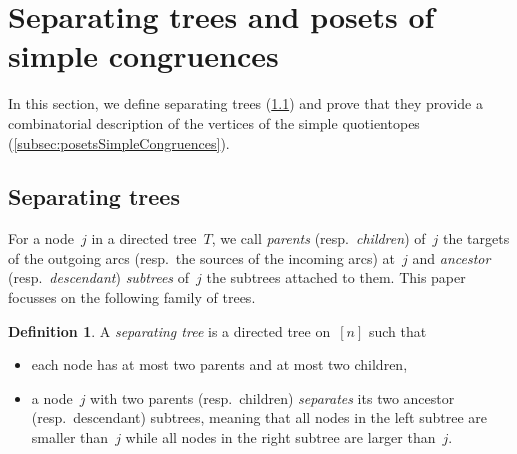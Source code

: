 \documentclass{amsart}
\theoremstyle{definition}
\newtheorem{definition}[theorem]{Definition}
\newcommand{\darkblue}{\color{darkblue}} %
\newcommand{\defn}[1]{\textsl{\darkblue #1}} %
\begin{document}

\section{Separating trees and posets of simple congruences}
\label{sec:separatingTreesPosetsSimpleCongruences}

In this section, we define separating trees (\cref{subsec:separatingTrees}) and prove that they provide a combinatorial description of the vertices of the simple quotientopes (\cref{subsec:posetsSimpleCongruences}).


\subsection{Separating trees}
\label{subsec:separatingTrees}

For a node~$j$ in a directed tree~$T$, we call \defn{parents} (resp.~\defn{children}) of~$j$ the targets of the outgoing arcs (resp.~the  sources of the incoming arcs) at~$j$ and \defn{ancestor} (resp.~\defn{descendant}) \defn{subtrees} of~$j$ the subtrees attached to them.
This paper focusses on the following family of trees.

\begin{definition}
\label{def:separatingTree}
A \defn{separating tree} is a directed tree on~$[n]$ such that
\begin{itemize}
\item each node has at most two parents and at most two children,
\item a node~$j$ with two parents (resp.~children) \defn{separates} its two ancestor (resp.~descendant) subtrees, meaning that all nodes in the left subtree are smaller than~$j$ while all nodes in the right subtree are larger than~$j$.
\end{itemize}
\end{definition}
\end{document}

